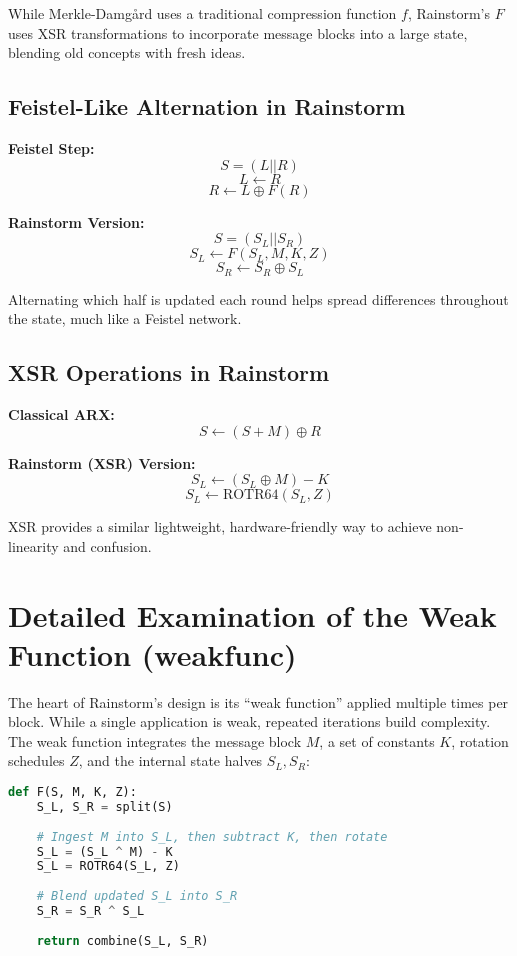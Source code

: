 \documentclass[11pt,a4paper]{article}
\begin{document}
While Merkle-Damg{\aa}rd uses a traditional compression function \( f \), Rainstorm’s \( F \) uses XSR transformations to incorporate message blocks into a large state, blending old concepts with fresh ideas.

\subsection*{Feistel-Like Alternation in Rainstorm}
\noindent\begin{minipage}[t]{0.45\textwidth}
\textbf{Feistel Step:}
\[
S = (L || R)
\]
\[
L \gets R
\]
\[
R \gets L \oplus F(R)
\]
\end{minipage}
\hfill
\begin{minipage}[t]{0.45\textwidth}
\textbf{Rainstorm Version:}
\[
S = (S_L || S_R)
\]
\[
S_L \gets F(S_L, M, K, Z)
\]
\[
S_R \gets S_R \oplus S_L
\]
\end{minipage}

Alternating which half is updated each round helps spread differences throughout the state, much like a Feistel network.

\subsection*{XSR Operations in Rainstorm}
\noindent\begin{minipage}[t]{0.45\textwidth}
\textbf{Classical ARX:}
\[
S \gets (S + M) \oplus R
\]
\end{minipage}
\hfill
\begin{minipage}[t]{0.45\textwidth}
\textbf{Rainstorm (XSR) Version:}
\[
S_L \gets (S_L \oplus M) - K
\]
\[
S_L \gets \text{ROTR64}(S_L, Z)
\]
\end{minipage}

XSR provides a similar lightweight, hardware-friendly way to achieve non-linearity and confusion.

\section*{Detailed Examination of the Weak Function (weakfunc)}
The heart of Rainstorm’s design is its “weak function” applied multiple times per block. While a single application is weak, repeated iterations build complexity. The weak function integrates the message block \( M \), a set of constants \( K \), rotation schedules \( Z \), and the internal state halves \( S_L, S_R \):

\begin{lstlisting}[language=Python, caption=Rainstorm Mixing Function (Conceptual)]
def F(S, M, K, Z):
    S_L, S_R = split(S)
    
    # Ingest M into S_L, then subtract K, then rotate
    S_L = (S_L ^ M) - K
    S_L = ROTR64(S_L, Z)
    
    # Blend updated S_L into S_R
    S_R = S_R ^ S_L
    
    return combine(S_L, S_R)
\end{lstlisting}
\end{document}
